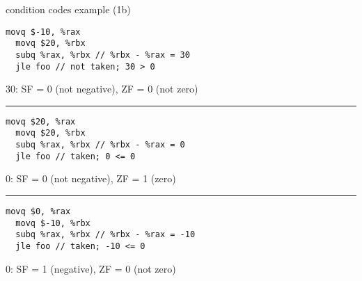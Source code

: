 \begin{frame}[fragile,label=ccEx1b]{condition codes example (1b)}
\begin{lstlisting}[style=small]
  movq $-10, %rax
  movq $20, %rbx
  subq %rax, %rbx // %rbx - %rax = 30 
  jle foo // not taken; 30 > 0
\end{lstlisting}
30: SF = 0 (not negative), ZF = 0 (not zero)
\hrule
\begin{lstlisting}[style=small]
  movq $20, %rax
  movq $20, %rbx
  subq %rax, %rbx // %rbx - %rax = 0
  jle foo // taken; 0 <= 0
\end{lstlisting}
0: SF = 0 (not negative), ZF = 1 (zero)
\hrule
\begin{lstlisting}[style=small]
  movq $0, %rax
  movq $-10, %rbx
  subq %rax, %rbx // %rbx - %rax = -10
  jle foo // taken; -10 <= 0
\end{lstlisting}
0: SF = 1 (negative), ZF = 0 (not zero)
\end{frame}

